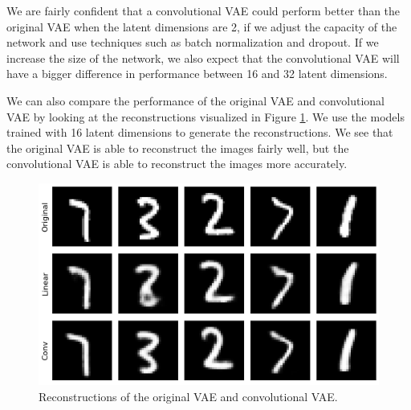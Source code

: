 We are fairly confident that a convolutional VAE could perform better than the original VAE when the latent dimensions are 2, if we adjust the capacity of the network and use techniques such as batch normalization and dropout. If we increase the size of the network, we also expect that the convolutional VAE will have a bigger difference in performance between 16 and 32 latent dimensions. 

We can also compare the performance of the original VAE and convolutional VAE by looking at the reconstructions visualized in Figure \ref{fig:reconstructions}. We use the models trained with 16 latent dimensions to generate the reconstructions. We see that the original VAE is able to reconstruct the images fairly well, but the convolutional VAE is able to reconstruct the images more accurately.

\begin{figure}[H]
\centering
\includegraphics[width=\textwidth]{images/reconstructions.png}
\caption{Reconstructions of the original VAE and convolutional VAE.}
\label{fig:reconstructions}
\end{figure}
